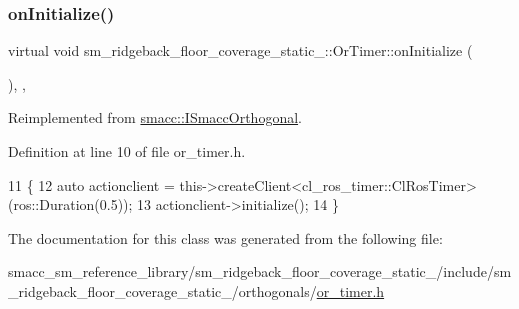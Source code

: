 \subsubsection{\texorpdfstring{on\+Initialize()}{onInitialize()}}
{\footnotesize\ttfamily virtual void sm\+\_\+ridgeback\+\_\+floor\+\_\+coverage\+\_\+static\+\_\+::\+Or\+Timer\+::on\+Initialize (\begin{DoxyParamCaption}{ }\end{DoxyParamCaption})\hspace{0.3cm}{\ttfamily [inline]}, {\ttfamily [override]}, {\ttfamily [virtual]}}



Reimplemented from \hyperlink{classsmacc_1_1ISmaccOrthogonal_a6bb31c620cb64dd7b8417f8705c79c7a}{smacc\+::\+I\+Smacc\+Orthogonal}.



Definition at line 10 of file or\+\_\+timer.\+h.


\begin{DoxyCode}
11     \{
12         \textcolor{keyword}{auto} actionclient = this->createClient<cl\_ros\_timer::ClRosTimer>(ros::Duration(0.5));
13         actionclient->initialize();
14     \}
\end{DoxyCode}


The documentation for this class was generated from the following file\+:\begin{DoxyCompactItemize}
\item 
smacc\+\_\+sm\+\_\+reference\+\_\+library/sm\+\_\+ridgeback\+\_\+floor\+\_\+coverage\+\_\+static\+\_/include/sm\+\_\+ridgeback\+\_\+floor\+\_\+coverage\+\_\+static\+\_/orthogonals/\hyperlink{sm__ridgeback__floor__coverage__static__1_2include_2sm__ridgeback__floor__coverage__static__1_2orthogonals_2or__timer_8h}{or\+\_\+timer.\+h}\end{DoxyCompactItemize}

